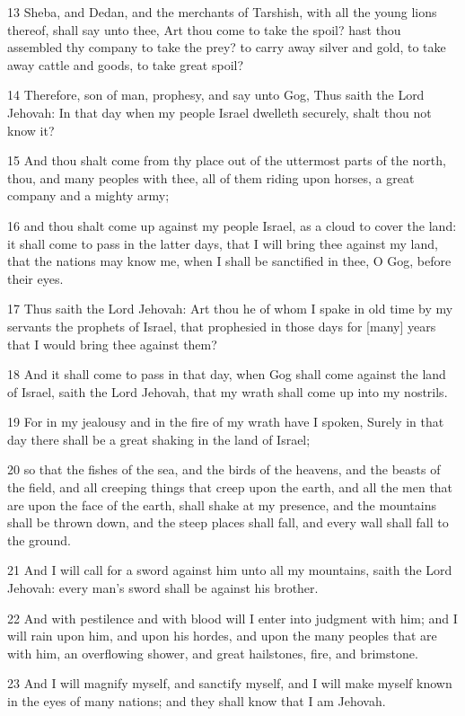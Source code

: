 \par 13 Sheba, and Dedan, and the merchants of Tarshish, with all the young lions thereof, shall say unto thee, Art thou come to take the spoil? hast thou assembled thy company to take the prey? to carry away silver and gold, to take away cattle and goods, to take great spoil?
\par 14 Therefore, son of man, prophesy, and say unto Gog, Thus saith the Lord Jehovah: In that day when my people Israel dwelleth securely, shalt thou not know it?
\par 15 And thou shalt come from thy place out of the uttermost parts of the north, thou, and many peoples with thee, all of them riding upon horses, a great company and a mighty army;
\par 16 and thou shalt come up against my people Israel, as a cloud to cover the land: it shall come to pass in the latter days, that I will bring thee against my land, that the nations may know me, when I shall be sanctified in thee, O Gog, before their eyes.
\par 17 Thus saith the Lord Jehovah: Art thou he of whom I spake in old time by my servants the prophets of Israel, that prophesied in those days for [many] years that I would bring thee against them?
\par 18 And it shall come to pass in that day, when Gog shall come against the land of Israel, saith the Lord Jehovah, that my wrath shall come up into my nostrils.
\par 19 For in my jealousy and in the fire of my wrath have I spoken, Surely in that day there shall be a great shaking in the land of Israel;
\par 20 so that the fishes of the sea, and the birds of the heavens, and the beasts of the field, and all creeping things that creep upon the earth, and all the men that are upon the face of the earth, shall shake at my presence, and the mountains shall be thrown down, and the steep places shall fall, and every wall shall fall to the ground.
\par 21 And I will call for a sword against him unto all my mountains, saith the Lord Jehovah: every man's sword shall be against his brother.
\par 22 And with pestilence and with blood will I enter into judgment with him; and I will rain upon him, and upon his hordes, and upon the many peoples that are with him, an overflowing shower, and great hailstones, fire, and brimstone.
\par 23 And I will magnify myself, and sanctify myself, and I will make myself known in the eyes of many nations; and they shall know that I am Jehovah.

